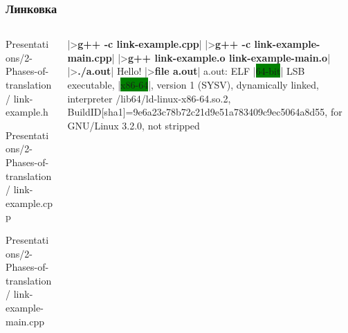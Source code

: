 \documentclass[compress]{beamer}
\newcommand{\shellprompt}{>}
\newcommand{\shellcommand}[1]{\shellprompt \space \textbf{#1}}
\begin{document}
\begin{frame}[fragile]

    \frametitle{Линковка}

    \begin{columns}[T]

        \begin{column}{0.4\textwidth}

            \CppInputListing
                {Presentations/2-Phases-of-translation/}
                {link-example.h}

            \CppInputListing
                {Presentations/2-Phases-of-translation/}
                {link-example.cpp}

            \CppInputListing
                {Presentations/2-Phases-of-translation/}
                {link-example-main.cpp}

        \end{column}

        \begin{column}{0.6\textwidth}

            \begin{ConsoleWindow}
|\shellcommand{g++ -c link-example.cpp}|
|\shellcommand{g++ -c link-example-main.cpp}|
|\shellcommand{g++ link-example.o link-example-main.o}|
|\shellcommand{./a.out}|
Hello!
|\shellcommand{file a.out}|
a.out: ELF |\colorbox{green}{64-bit}| LSB executable, |\colorbox{green}{x86-64}|, version 1 (SYSV), dynamically linked, interpreter /lib64/ld-linux-x86-64.so.2, BuildID[sha1]=9e6a23c78b72c21d9e51a783409c9ec5064a8d55, for GNU/Linux 3.2.0, not stripped
            \end{ConsoleWindow}

        \end{column}

    \end{columns}

\end{frame}
\end{document}

